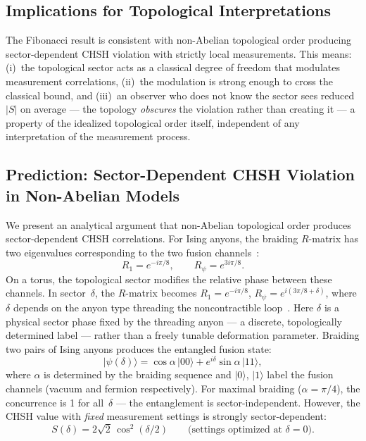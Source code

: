 \documentclass[aps,pra,twocolumn,superscriptaddress,showpacs,floatfix]{revtex4-2}
\newcommand{\ket}[1]{| #1 \rangle}
\begin{document}
\subsection{Implications for Topological Interpretations}

The Fibonacci result is consistent with non-Abelian topological order producing
sector-dependent CHSH violation with strictly local measurements. This means:
(i)~the topological sector acts as a classical degree of freedom that modulates measurement
correlations, (ii)~the modulation is strong enough to cross the classical bound, and
(iii)~an observer who does not know the sector sees reduced $|S|$ on average ---
the topology \emph{obscures} the violation rather than creating it --- a property
of the idealized topological order itself, independent of any interpretation of
the measurement process.

\subsection{Prediction: Sector-Dependent CHSH Violation in Non-Abelian Models}
\label{sec:ising_prediction}

We present an analytical argument that non-Abelian topological order produces
sector-dependent CHSH correlations. For Ising anyons, the braiding $R$-matrix has
two eigenvalues corresponding to the two fusion channels~\cite{Nayak2008,Kitaev2006}:
\begin{equation}
  R_1 = e^{-i\pi/8}, \qquad R_\psi = e^{3i\pi/8}.
  \label{eq:ising_r}
\end{equation}
On a torus, the topological sector modifies the relative phase between these
channels. In sector~$\delta$, the $R$-matrix becomes
$R_1 = e^{-i\pi/8}$, $R_\psi = e^{i(3\pi/8 + \delta)}$, where $\delta$ depends
on the anyon type threading the noncontractible loop~\cite{Kitaev2003,Kitaev2006}.
Here $\delta$ is a physical sector phase fixed by the threading anyon --- a
discrete, topologically determined label --- rather than a freely tunable
deformation parameter.
Braiding two pairs of Ising anyons produces the entangled fusion state:
\begin{equation}
  \ket{\psi(\delta)} = \cos\alpha\,\ket{00} + e^{i\delta}\sin\alpha\,\ket{11},
  \label{eq:ising_state}
\end{equation}
where $\alpha$ is determined by the braiding sequence and $\ket{0}$, $\ket{1}$
label the fusion channels (vacuum and fermion respectively). For maximal braiding
($\alpha = \pi/4$), the concurrence is 1 for all~$\delta$ --- the entanglement is
sector-independent. However, the CHSH value with \emph{fixed} measurement settings
is strongly sector-dependent:
\begin{equation}
  S(\delta) = 2\sqrt{2}\,\cos^2(\delta/2)
  \qquad\text{(settings optimized at $\delta{=}0$)}.
  \label{eq:s_delta}
\end{equation}
\end{document}
